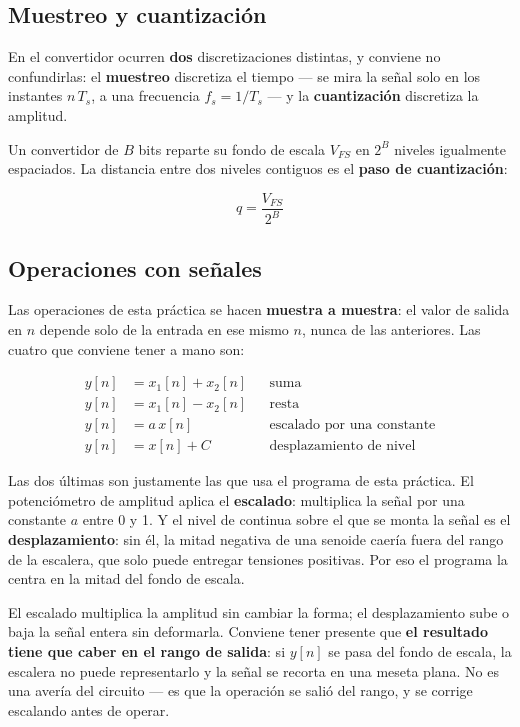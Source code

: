 \documentclass[11pt,a4paper]{article}
\begin{document}
\subsection{Muestreo y cuantización}
En el convertidor ocurren \textbf{dos} discretizaciones distintas, y conviene no
confundirlas: el \textbf{muestreo} discretiza el tiempo --- se mira la señal solo en
los instantes $n\,T_s$, a una frecuencia $f_s = 1/T_s$ --- y la \textbf{cuantización}
discretiza la amplitud.

Un convertidor de $B$ bits reparte su fondo de escala $V_{FS}$ en $2^{B}$ niveles
igualmente espaciados. La distancia entre dos niveles contiguos es el \textbf{paso de
cuantización}:

\begin{equation}
  q = \frac{V_{FS}}{2^{B}}
  \label{eq:paso}
\end{equation}

\subsection{Operaciones con señales}
\label{sec:operaciones}
Las operaciones de esta práctica se hacen \textbf{muestra a muestra}: el valor de
salida en $n$ depende solo de la entrada en ese mismo $n$, nunca de las anteriores.
Las cuatro que conviene tener a mano son:

\begin{align}
  y[n] &= x_1[n] + x_2[n] & &\text{suma} \\
  y[n] &= x_1[n] - x_2[n] & &\text{resta} \\
  y[n] &= a\,x[n]         & &\text{escalado por una constante} \\
  y[n] &= x[n] + C        & &\text{desplazamiento de nivel}
\end{align}

Las dos últimas son justamente las que usa el programa de esta práctica. El
potenciómetro de amplitud aplica el \textbf{escalado}: multiplica la señal por una
constante $a$ entre \num{0} y \num{1}. Y el nivel de continua sobre el que se monta la
señal es el \textbf{desplazamiento}: sin él, la mitad negativa de una senoide caería
fuera del rango de la escalera, que solo puede entregar tensiones positivas. Por eso el
programa la centra en la mitad del fondo de escala.

El escalado multiplica la amplitud sin cambiar la forma; el desplazamiento sube o baja
la señal entera sin deformarla. Conviene tener presente que \textbf{el resultado tiene
que caber en el rango de salida}: si $y[n]$ se pasa del fondo de escala, la escalera no
puede representarlo y la señal se recorta en una meseta plana. No es una avería del
circuito --- es que la operación se salió del rango, y se corrige escalando antes de
operar.
\end{document}
